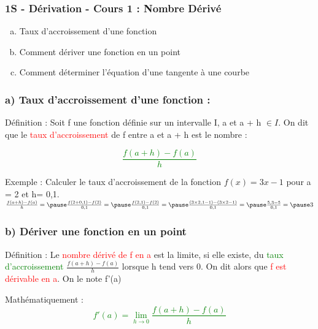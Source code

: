 \documentclass[t]{beamer}
\begin{document}
	\begin{frame}
		\frametitle{1S - Dérivation - Cours 1 : Nombre Dérivé}
		\begin{enumerate}[a)]
			\item Taux d'accroissement d'une fonction
			\item Comment dériver une fonction en un point
			\item Comment déterminer l'équation d'une tangente à une courbe
		\end{enumerate}
	\end{frame}

	\begin{frame}[label=pagebanale]
		\frametitle{a)  Taux d'accroissement d'une fonction : }
		\pause
		\begin{block}{Définition :}
			\pause
			Soit f une fonction définie sur un intervalle I, \pause a et a + h $ \in I$. \pause
			On dit que le \textcolor{red}{taux d'accroissement} de f \pause entre a et a + h \pause est le nombre : 
			\pause
		\end{block}

		{\huge \textcolor{green}{\[\frac{f(a+h) - f(a)}{h}\]}}

		\pause
		\begin{exampleblock}{Exemple :}
			\pause
			Calculer le taux d'accroissement \pause
			de la fonction $f(x)=3x -1$ \pause 
			pour a = 2 \pause et h= 0,1. \\
			\pause
			\( \frac{f(a+h) - f(a)}{h} = \pause
			\frac{f(2+0,1) - f(2)}{0,1} = \pause 
			\frac{f(2,1) - f(2)}{0,1} = \pause
			\frac{(3 \times 2,1 - 1) - (3 \times 2 - 1)}{0,1} = \pause
			\frac{ 5,3 - 5}{0,1} = \pause
			3
			\)
		\end{exampleblock}
	\end{frame}

	\begin{frame}[label=pagebanale]
		\frametitle{b) Dériver une fonction en un point}
		\pause
		\begin{block}{Définition :}
			\pause
			Le \textcolor{red}{nombre dérivé de f en a} est la limite, \pause si elle existe, \pause du \textcolor{green}{taux d'accroissement} \pause
			\(\frac{f(a+h) - f(a)}{h}\)
			\pause
			lorsque h tend vers 0. \pause 
			On dit alors que \textcolor{red}{f est dérivable en a}. \pause On le note f'(a)
			\pause
		\end{block}
		\begin{block}{Mathématiquement :}
			\pause
			{\Huge \textcolor{green}{\[ f'(a) = \lim\limits_{h \rightarrow 0}\frac{f(a+h) - f(a)}{h}\]}}
		\end{block}
	\end{frame}
\end{document}
